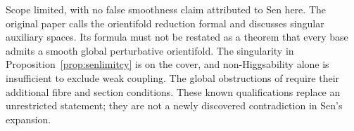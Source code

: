 \begin{verdict}[claim 23]
Scope limited, with no false smoothness claim attributed to Sen here. The original paper calls the orientifold reduction formal and discusses singular auxiliary spaces. Its formula must not be restated as a theorem that every base admits a smooth global perturbative orientifold. The singularity in Proposition~\ref{prop:senlimitcy} is on the cover, and non-Higgsability alone is insufficient to exclude weak coupling. The global obstructions of \cite{HLS18} require their additional fibre and section conditions. These known qualifications replace an unrestricted statement; they are not a newly discovered contradiction in Sen's expansion.
\end{verdict}
